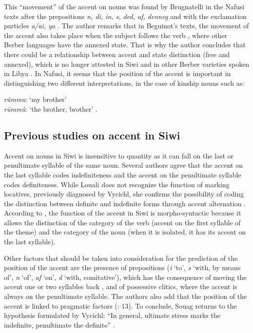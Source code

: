 \documentclass[output=paper]{langsci/langscibook}
\begin{document}
\largerpage
This ``movement'' of the accent on nouns was found by Brugnatelli in the Nafusi texts after the prepositions {\emph{n, di, in, s, ded, af, denneg}} and with the exclamation particles {\emph{a/ai, ya}} \citep[][64-65]{brugnatelli:86}. The author remarks that in Beguinot's texts, the movement of the accent also takes place when the subject follows the verb \citep[][66]{brugnatelli:86}, where other Berber languages have the annexed state. That is why the author concludes that there could be a relationship between accent and state distinction (free and annexed), which is no longer attested in Siwi and in other Berber varieties spoken in Libya \citep[][68]{brugnatelli:86}. In Nafusi, it seems that the position of the accent is important in distinguishing two different interpretations, in the case of kinship nouns such as:

\begin{exe}
\exi{}
{\emph{rûmmu}}: `my brother' \\
{\emph{rūmmû}}: `the brother, brother' \citep[][28-29]{beguinot:42}.
\end{exe}


\subsection{Previous studies on accent in Siwi}\label{5sec:13}

Accent on nouns in Siwi is insensitive to quantity as it can fall on the last or penultimate syllable of the same noun. Several authors agree that the accent on the last syllable codes indefiniteness and the accent on the penultimate syllable codes definiteness. While Louali does not recognize the function of marking locatives, previously diagnosed by Vycichl, she confirms the possibility of coding the distinction between definite and indefinite forms through accent alternation \citep[][68-69]{louali:03}. According to \cite{louali:philippson:04,louali:philippson:05}, the function of the accent in Siwi is morpho-syntactic because it allows the distinction of the category of the verb (accent on the first syllable of the theme) and the category of the noun (when it is isolated, it has its accent on the last syllable).

{
Other factors that should be taken into consideration for the prediction of the position of the accent are the presence of prepositions ({\emph{i}} `to', {\emph{s}} `with, by means of', {\emph{n}} `of', {\emph{af}} `on', {\emph{d}} `with, comitative'), which has the consequence of moving the accent one or two syllables back \citep{louali:philippson:05}, and of possessive clitics, where the accent is always on the penultimate syllable. The authors also add that the position of the accent is linked to  pragmatic factors (\citeyear{louali:philippson:05}: 13). To conclude, Souag returns to the hypothesis formulated by Vycichl: ``In general, ultimate stress marks the indefinite, penultimate the definite'' \citep[][80]{souag:13}.
}
\end{document}
